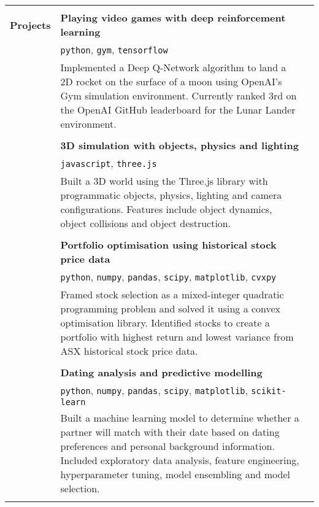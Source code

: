 \documentclass[a4paper,10pt]{letter}
\begin{document}
\begin{longtable}{ @{} p{2.5cm} p{12cm} r }
\hline \\
\textbf{Projects} & \textbf{Playing video games with deep reinforcement learning} & \\
 & \texttt{python}, \texttt{gym}, \texttt{tensorflow} & \\
 & Implemented a Deep Q-Network algorithm to land a 2D rocket on the surface of a moon using OpenAI's Gym simulation environment. Currently ranked 3rd on the OpenAI GitHub leaderboard for the Lunar Lander environment. & \\
 & & \\
 & \textbf{3D simulation with objects, physics and lighting} & \\
 & \texttt{javascript}, \texttt{three.js} & \\
 & Built a 3D world using the Three.js library with programmatic objects, physics, lighting and camera configurations. Features include object dynamics, object collisions and object destruction. & \\
 & & \\
 & \textbf{Portfolio optimisation using historical stock price data} & \\
 & \texttt{python}, \texttt{numpy}, \texttt{pandas}, \texttt{scipy}, \texttt{matplotlib}, \texttt{cvxpy} & \\
 & Framed stock selection as a mixed-integer quadratic programming problem and solved it using a convex optimisation library. Identified stocks to create a portfolio with highest return and lowest variance from ASX historical stock price data. & \\
 & & \\
 & \textbf{Dating analysis and predictive modelling} & \\
 & \texttt{python}, \texttt{numpy}, \texttt{pandas}, \texttt{scipy}, \texttt{matplotlib}, \texttt{scikit-learn} & \\
 & Built a machine learning model to determine whether a partner will match with their date based on dating preferences and personal background information. Included exploratory data analysis, feature engineering, hyperparameter tuning, model ensembling and model selection. & \\
 & & \\


\end{longtable}
\end{document}
